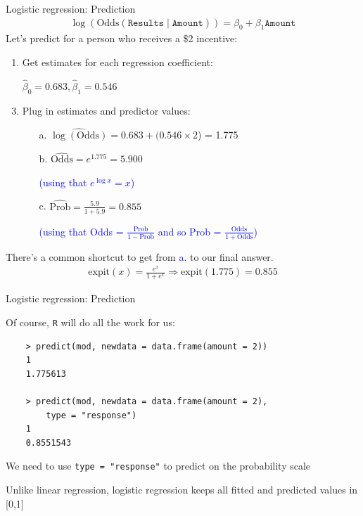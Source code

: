 \documentclass[10pt,t]{beamer}
\begin{document}
\begin{frame}{Logistic regression: Prediction}
	\vspace{-1cm}
			\begin{align*}
		\log(\text{Odds}(\texttt{Results} \mid \texttt{Amount})) = \beta_0 + \beta_1 \texttt{Amount}
		\end{align*}
	Let's predict for a person who receives a \$2 incentive:
	\begin{enumerate}
		\item Get estimates for each regression coefficient: 
		\item[] $\hat{\beta}_0 = 0.683, \hat{\beta}_1 = 0.546$
		\item Plug in estimates and predictor values:
		\begin{enumerate}
			\item[a.] $\widehat{\log(\text{Odds})} = 0.683 + (0.546\times2$) = 1.775
			\item[b.] $\widehat{\text{Odds}} = e^{1.775} = 5.900$
			\item[] \textcolor{blue}{(using that $e^{\log x} = x$)}
			\item[c.] $\widehat{\text{Prob}} = \frac{5.9}{1 + 5.9} = 0.855$
			\item[] \textcolor{blue}{(using that Odds = $\frac{\text{Prob}}{1-\text{Prob}}$ and so Prob = $\frac{\text{Odds}}{1  +\text{Odds}}$)}
		\end{enumerate}
	\end{enumerate}
\smallskip
	There's a common shortcut to get from \textcolor{blue}{a.} to our final answer. 
	\begin{align*}
		\text{expit}(x) = \frac{e^x}{1 + e^x} \Rightarrow \text{expit}(1.775) = 0.855
	\end{align*}
\end{frame}

\begin{frame}[fragile]{Logistic regression: Prediction}
	\vspace{-5mm}
	
	Of course, \texttt{R} will do all the work for us: 
	
	\small
	\begin{verbatim}
	> predict(mod, newdata = data.frame(amount = 2))
	1 
	1.775613
	
	> predict(mod, newdata = data.frame(amount = 2), 
	    type = "response")
	1 
	0.8551543 
	\end{verbatim}
	
	\medskip
	
	\normalsize
	We need to use \texttt{type = "response"} to predict on the probability scale

\bigskip

	Unlike linear regression, logistic regression keeps all fitted and predicted values in [0,1]
	
	
\end{frame}
\end{document}

